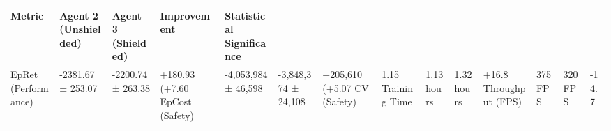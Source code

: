 \begin{tabular}{lllll}
\toprule
Metric & Agent 2 (Unshielded) & Agent 3 (Shielded) & Improvement & Statistical Significance \\
\midrule
EpRet (Performance) & -2381.67 ± 253.07 & -2200.74 ± 263.38 & +180.93 (+7.60%
EpCost (Safety) & -4,053,984 ± 46,598 & -3,848,374 ± 24,108 & +205,610 (+5.07%
CV (Safety) & 1.15%
Training Time & 1.13 hours & 1.32 hours & +16.8%
Throughput (FPS) & 375 FPS & 320 FPS & -14.7%
\bottomrule
\end{tabular}
